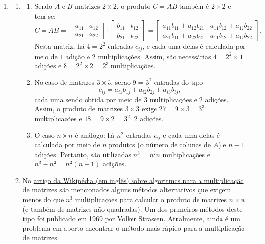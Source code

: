 \documentclass[12pt,a4paper]{article}
\begin{document}
\begin{enumerate}
\item 
\begin{enumerate}
\item 
\begin{enumerate}
\item Sendo $A$ e $B$ matrizes $2 \times 2$, o produto $C = AB$ também é $2 \times 2$ e tem-se:
\[
C = AB =
\begin{bmatrix}
a_{11} & a_{12}\\
a_{21} & a_{22}
\end{bmatrix}
\cdot
\begin{bmatrix}
b_{11} & b_{12}\\
b_{21} & b_{22}
\end{bmatrix}
=
\begin{bmatrix}
a_{11}b_{11} + a_{12}b_{21} & a_{11}b_{12} + a_{12}b_{22}\\
a_{21}b_{11} + a_{22}b_{21} & a_{11}b_{12} + a_{12}b_{22}
\end{bmatrix}.
\]
Nesta matriz, há $4 = 2^2$ entradas $c_{ij}$, e cada uma delas é calculada por meio de $1$ adição e $2$ multiplicações. Assim, são necessárias $4 = 2^2 \times 1$ adições e $8 = 2^2 \times 2 = 2^3$ multiplicações.
\item No caso de matrizes $3 \times 3$, serão $9 = 3^2$ entradas do tipo
\[
c_{ij} = a_{i1}b_{1j} + a_{i2}b_{2j} + a_{i3}b_{3j},
\]
cada uma sendo obtida por meio de $3$ multiplicações e $2$ adições. Assim, o produto de matrizes $3 \times 3$ exige $27 = 9 \times 3 = 3^3$ multiplicações e $18 = 9 \times 2 = 3^2 \cdot 2$ adições.
\item O caso $n \times n$ é análogo: há $n^2$ entradas $c_{ij}$ e cada uma delas é calculada por meio de $n$ produtos (o número de colunas de $A$) e $n-1$ adições. Portanto, são utilizadas $n^3 = n^2 n$ multiplicações e $n^3 - n^2 = n^2 (n-1)$ adições.
\end{enumerate}

\item No \href{https://en.wikipedia.org/wiki/Matrix_multiplication_algorithm#Sub-cubic_algorithms}{artigo da Wikipédia (em inglês) sobre algoritmos para a multiplicação de matrizes} são mencionados alguns métodos alternativos que exigem menos do que $n^3$ multiplicações para calcular o produto de matrizes $n\times n$ (e também de matrizes não quadradas).
Um dos primeiros métodos deste tipo foi \href{https://dx.doi.org/10.1007\%2FBF02165411}{publicado em 1969 por Volker Strassen}. Atualmente, ainda é um problema em aberto encontrar o método mais rápido para a multiplicação de matrizes.
\end{enumerate}




\end{enumerate}
\end{document}
